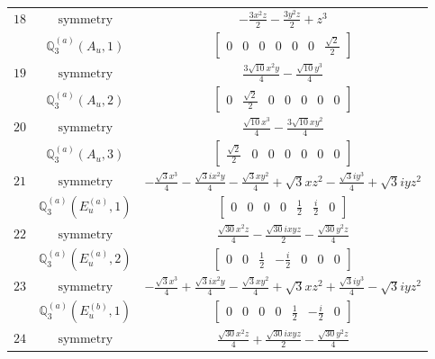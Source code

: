 \documentclass[fleqn,8pt,landscape]{jsarticle}
\begin{document}
\begin{longtable}{ccc}
$ 18 $ & $ \text{symmetry} $ & $ - \frac{3 x^{2} z}{2} - \frac{3 y^{2} z}{2} + z^{3} $ \\
$  $ & $ \mathbb{Q}_{3}^{(a)}(A_{u},1) $ & $ \begin{bmatrix} 0 & 0 & 0 & 0 & 0 & 0 & \frac{\sqrt{2}}{2} \end{bmatrix} $ \\ \hline
$ 19 $ & $ \text{symmetry} $ & $ \frac{3 \sqrt{10} x^{2} y}{4} - \frac{\sqrt{10} y^{3}}{4} $ \\
$  $ & $ \mathbb{Q}_{3}^{(a)}(A_{u},2) $ & $ \begin{bmatrix} 0 & \frac{\sqrt{2}}{2} & 0 & 0 & 0 & 0 & 0 \end{bmatrix} $ \\ \hline
$ 20 $ & $ \text{symmetry} $ & $ \frac{\sqrt{10} x^{3}}{4} - \frac{3 \sqrt{10} x y^{2}}{4} $ \\
$  $ & $ \mathbb{Q}_{3}^{(a)}(A_{u},3) $ & $ \begin{bmatrix} \frac{\sqrt{2}}{2} & 0 & 0 & 0 & 0 & 0 & 0 \end{bmatrix} $ \\ \hline
$ 21 $ & $ \text{symmetry} $ & $ - \frac{\sqrt{3} x^{3}}{4} - \frac{\sqrt{3} i x^{2} y}{4} - \frac{\sqrt{3} x y^{2}}{4} + \sqrt{3} x z^{2} - \frac{\sqrt{3} i y^{3}}{4} + \sqrt{3} i y z^{2} $ \\
$  $ & $ \mathbb{Q}_{3}^{(a)}(E_{u}^{(a)},1) $ & $ \begin{bmatrix} 0 & 0 & 0 & 0 & \frac{1}{2} & \frac{i}{2} & 0 \end{bmatrix} $ \\ \hline
$ 22 $ & $ \text{symmetry} $ & $ \frac{\sqrt{30} x^{2} z}{4} - \frac{\sqrt{30} i x y z}{2} - \frac{\sqrt{30} y^{2} z}{4} $ \\
$  $ & $ \mathbb{Q}_{3}^{(a)}(E_{u}^{(a)},2) $ & $ \begin{bmatrix} 0 & 0 & \frac{1}{2} & - \frac{i}{2} & 0 & 0 & 0 \end{bmatrix} $ \\ \hline
$ 23 $ & $ \text{symmetry} $ & $ - \frac{\sqrt{3} x^{3}}{4} + \frac{\sqrt{3} i x^{2} y}{4} - \frac{\sqrt{3} x y^{2}}{4} + \sqrt{3} x z^{2} + \frac{\sqrt{3} i y^{3}}{4} - \sqrt{3} i y z^{2} $ \\
$  $ & $ \mathbb{Q}_{3}^{(a)}(E_{u}^{(b)},1) $ & $ \begin{bmatrix} 0 & 0 & 0 & 0 & \frac{1}{2} & - \frac{i}{2} & 0 \end{bmatrix} $ \\ \hline
$ 24 $ & $ \text{symmetry} $ & $ \frac{\sqrt{30} x^{2} z}{4} + \frac{\sqrt{30} i x y z}{2} - \frac{\sqrt{30} y^{2} z}{4} $ \\

\end{longtable}
\end{document}
